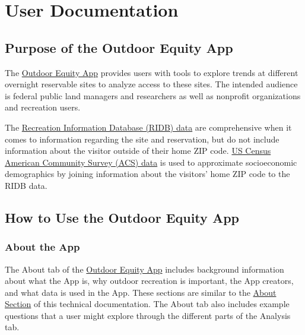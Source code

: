 \documentclass[
]{book}
\begin{document}
\hypertarget{user-documentation}{%
\chapter{User Documentation}\label{user-documentation}}

\hypertarget{purpose-of-the-outdoor-equity-app}{%
\section{Purpose of the Outdoor Equity App}\label{purpose-of-the-outdoor-equity-app}}

The \href{https://shinyapps.bren.ucsb.edu/oe_app/}{Outdoor Equity App} provides users with tools to explore trends at different overnight reservable sites to analyze access to these sites. The intended audience is federal public land managers and researchers as well as nonprofit organizations and recreation users.

The \href{https://ridb.recreation.gov/landing}{Recreation Information Database (RIDB) data} are comprehensive when it comes to information regarding the site and reservation, but do not include information about the visitor outside of their home ZIP code. \href{https://www.census.gov/programs-surveys/acs/data.html}{US Census American Community Survey (ACS) data} is used to approximate socioeconomic demographics by joining information about the visitors' home ZIP code to the RIDB data.

\hypertarget{how-to-use-the-outdoor-equity-app}{%
\section{How to Use the Outdoor Equity App}\label{how-to-use-the-outdoor-equity-app}}

\hypertarget{about-the-app}{%
\subsection{About the App}\label{about-the-app}}

The About tab of the \href{https://shinyapps.bren.ucsb.edu/oe_app/}{Outdoor Equity App} includes background information about what the App is, why outdoor recreation is important, the App creators, and what data is used in the App. These sections are similar to the \protect\hyperlink{about}{About Section} of this technical documentation. The About tab also includes example questions that a user might explore through the different parts of the Analysis tab.
\end{document}
